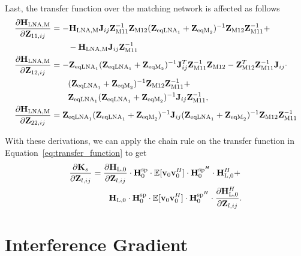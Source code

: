 Last, the transfer function over the matching network is affected as follows
\begin{align}
\label{eq:HLNAM_sig_grad}
\nonumber
\frac{\partial\mathbf{H}_\text{LNA,M}}{\partial\mathbf{Z}_{11,ij}}&=
-\mathbf{H}_\text{LNA,M}\mathbf{J}_{ij}\mathbf{Z}_\text{M11}^{-1}\mathbf{Z}_\text{M12}
	(\mathbf{Z}_{\text{eqLNA}_1} + \mathbf{Z}_{\text{eqM}_2})^{-1}
	\mathbf{Z}_\text{M12}\mathbf{Z}_\text{M11}^{-1} +\\
  &\qquad- \mathbf{H}_\text{LNA,M}\mathbf{J}_{ij}\mathbf{Z}_\text{M11}^{-1}\\\nonumber
\frac{\partial\mathbf{H}_\text{LNA,M}}{\partial\mathbf{Z}_{12,ij}}&=
	-\mathbf{Z}_{\text{eqLNA}_1}(\mathbf{Z}_{\text{eqLNA}_1} + \mathbf{Z}_{\text{eqM}_2})^{-1}
	\mathbf{J}_{ij}^T\mathbf{Z}_\text{M11}^{-1}\mathbf{Z}_\text{M12} - 
	\mathbf{Z}_\text{M12}^T\mathbf{Z}_\text{M11}^{-1}\mathbf{J}_{ij}\cdot\\\nonumber
  &\qquad(\mathbf{Z}_{\text{eqLNA}_1} + \mathbf{Z}_{\text{eqM}_2})^{-1}
	\mathbf{Z}_\text{M12}\mathbf{Z}_\text{M11}^{-1} + \\
  &\qquad\mathbf{Z}_{\text{eqLNA}_1}(\mathbf{Z}_{\text{eqLNA}_1} + \mathbf{Z}_{\text{eqM}_2})^{-1}
	\mathbf{J}_{ij}\mathbf{Z}_\text{M11}^{-1},\\
\frac{\partial\mathbf{H}_\text{LNA,M}}{\partial\mathbf{Z}_{22,ij}}&=
\mathbf{Z}_{\text{eqLNA}_1}(\mathbf{Z}_{\text{eqLNA}_1} + \mathbf{Z}_{\text{eqM}_2})^{-1}\mathbf{J}_{ij}(\mathbf{Z}_{\text{eqLNA}_1} + \mathbf{Z}_{\text{eqM}_2})^{-1}\mathbf{Z}_\text{M12}\mathbf{Z}_\text{M11}^{-1}
\label{eq:HLNAM_sig_grad_22}
\end{align}

With these derivations, we can apply the chain rule on the transfer function in Equation~\eqref{eq:transfer_function} to get 
\begin{align}
\label{eq:signal_gradient}\nonumber
\frac{\partial\mathbf{K}_s}{\partial\mathbf{Z}_{l,ij}} &= \frac{\partial\mathbf{H}_\text{L,0}}{\partial\mathbf{Z}_{l,ij}}\cdot \mathbf{H}_{0}^{\text{sp}}
	\cdot\mathbb{E}[\mathbf{v}_0\mathbf{v}_0^H]\cdot
	\mathbf{H}_{0}^{\text{sp}^H} \cdot \mathbf{H}_\text{L,0}^H + \\
&\qquad	\mathbf{H}_\text{L,0}\cdot \mathbf{H}_{0}^{\text{sp}}
	\cdot\mathbb{E}[\mathbf{v}_0\mathbf{v}_0^H]\cdot
	\mathbf{H}_{0}^{\text{sp}^H} \cdot \frac{\partial\mathbf{H}_\text{L,0}^H }{\partial\mathbf{Z}_{l,ij}}.
\end{align}

\section{Interference Gradient}
\label{sec:interf_gradient}


